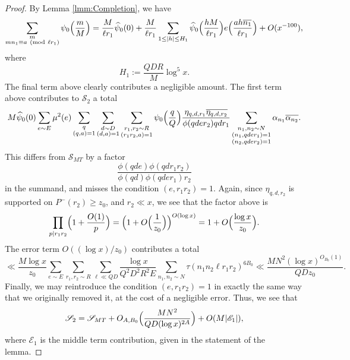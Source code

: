 \documentclass[10pt]{amsart}
\theoremstyle{plain}
\numberwithin{equation}{section}
\newcommand{\Mod}[1]{\ (\mathrm{mod}\ #1)}
\renewcommand{\hat}[1]{\widehat #1}
\begin{document}
\begin{proof}
By Lemma \ref{lmm:Completion}, we have
\[
\sum_{\substack{m\\ m n_1\equiv a\Mod{\ell r_1}}} \psi_0\Bigl(\frac{m}{M}\Bigr)=\frac{M}{\ell r_1 }\hat{\psi_0}(0)+\frac{M}{\ell r_1}\sum_{1\le |h|\le H_1}\hat{\psi}_0\Bigl(\frac{h M}{\ell r_1}\Bigr)e\Bigl( \frac{a h \overline{ n_1}}{\ell r_1}\Bigr)+O(x^{-100}),
\]
where
\[
H_1:=\frac{Q D R}{M} \log^5{x}.
\]
The final term above clearly contributes a negligible amount. The first term above contributes to $\mathscr{S}_2$ a total 
\[
M\hat{\psi_0}(0)\sum_{e\sim E}\mu^2(e) \sum_{\substack{q\\ (q,a)=1}}\sum_{\substack{d\sim D\\ (d,a)=1}}\sum_{\substack{r_1,r_2\sim R\\ (r_1r_2,a)=1}}\psi_0\Bigl(\frac{q}{Q}\Bigr)\frac{\eta_{q,d,r_1}\overline{\eta_{q,d,r_2}} }{\phi(q d e r_2)q d  r_1}\sum_{\substack{n_1,n_2\sim N\\ (n_1,q d e r_1)=1\\(n_2,q d e r_2)=1}}\alpha_{n_1}\overline{\alpha_{n_2}}.
\]
This differs from $\mathscr{S}_{MT}$ by a factor
\[
\frac{\phi(q de )\phi(q d r_1 r_2)}{\phi(q d)\phi(q d e r_1) r_2}
\]
in the summand, and misses the condition $(e,r_1r_2)=1$. Again, since $\eta_{q,d,r_2}$ is supported on $P^-(r_2)\ge z_0$, and $r_2\ll x$, we see that the factor above is 
\[
\prod_{p|r_1r_2}\Bigl(1+\frac{O(1)}{p}\Bigr)=\Bigl(1+O\Bigl(\frac{1}{z_0}\Bigr)\Bigr)^{O(\log{x})}=1+O\Bigl(\frac{\log{x}}{z_0}\Bigr).
\]
 The error term $O((\log{x})/z_0)$ contributes a total
\[
\ll \frac{M\log{x}}{z_0}\sum_{e\sim E}\sum_{r_1,r_2\sim R}\sum_{\ell\ll Q D}\frac{\log{x}}{Q^2 D^2 R^2 E}\sum_{n_1,n_2\sim N}\tau(n_1n_2\ell r_1r_2)^{6B_0}\ll \frac{MN^2(\log{x})^{O_{B_0}(1)}}{QD z_0}.
\]
Finally, we may reintroduce the condition $(e,r_1r_2)=1$ in exactly the same way that we originally removed it, at the cost of a negligible error. Thus, we see that
\begin{equation}
\mathscr{S}_{2}=\mathscr{S}_{MT}+O_{A,B_0}\Bigl(\frac{MN^2}{QD (\log{x})^{2A}}\Bigr)+O(M|\mathscr{E}_{1}|),\label{eq:S22Estimate}
\end{equation}
where $\mathscr{E}_{1}$ is the middle term contribution, given in the statement of the lemma. 
\end{proof}
%
%
%
%
%
%
%
%
\end{document}
